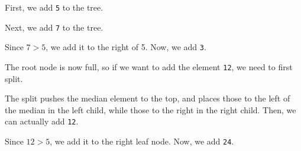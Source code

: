 \documentclass[a4paper, openany]{memoir}
\begin{document}
\noindent First, we add \texttt{5} to the tree.
\begin{center}
\end{center}
Next, we add \texttt{7} to the tree.
\begin{center}
\end{center}
Since $7 > 5$, we add it to the right of 5. Now, we add \texttt{3}.
\begin{center}
\end{center}
The root node is now full, so if we want to add the element \texttt{12}, we need to first split.
\begin{center}
\end{center}
The split pushes the median element to the top, and places those to the left of the median in the left child, while those to the right in the right child. Then, we can actually add \texttt{12}.
\begin{center}
\end{center}
Since $12 > 5$, we add it to the right leaf node. Now, we add \texttt{24}.
\begin{center}
\end{center}
\end{document}
